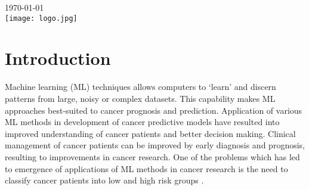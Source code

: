 \begin{titlepage}


{\large \today}\\[2cm] %


\texttt{[image: logo.jpg]}\\[1cm] %


\vfill %

\end{titlepage}

\linespread{1.25}




\section{Introduction}

\noindent
Machine learning (ML) techniques allows computers to `learn' and discern patterns from large, noisy or complex datasets. This capability makes ML approaches best-suited to cancer prognosis and prediction. Application of various ML methods in development of cancer predictive models have resulted into improved understanding of cancer patients and better decision making. Clinical management of cancer patients can be improved by early diagnosis and prognosis, resulting to improvements in cancer research. One of the problems which has led to emergence of applications of ML methods in cancer research is the need to classify cancer patients into low and high risk groups \citep{kourou2015machine}.\\

